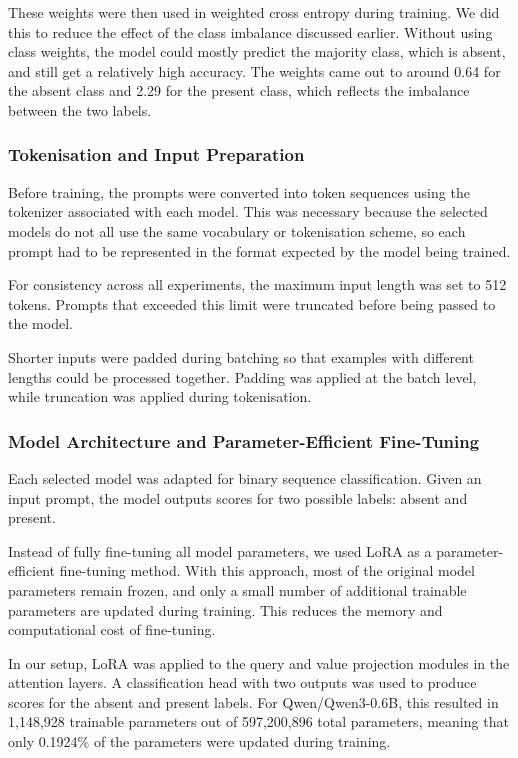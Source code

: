 These weights were then used in weighted cross entropy during training. We did this to reduce the effect of the class imbalance discussed earlier. Without using class weights, the model could mostly predict the majority class, which is absent, and still get a relatively high accuracy. The weights came out to around 0.64 for the absent class and 2.29 for the present class, which reflects the imbalance between the two labels.

\subsubsection{Tokenisation and Input Preparation}

Before training, the prompts were converted into token sequences using the tokenizer associated with each model. This was necessary because the selected models do not all use the same vocabulary or tokenisation scheme, so each prompt had to be represented in the format expected by the model being trained.

For consistency across all experiments, the maximum input length was set to 512 tokens. Prompts that exceeded this limit were truncated before being passed to the model.

Shorter inputs were padded during batching so that examples with different lengths could be processed together. Padding was applied at the batch level, while truncation was applied during tokenisation.

\subsubsection{Model Architecture and Parameter-Efficient Fine-Tuning}

Each selected model was adapted for binary sequence classification. Given an input prompt, the model outputs scores for two possible labels: absent and present.

Instead of fully fine-tuning all model parameters, we used LoRA as a parameter-efficient fine-tuning method. With this approach, most of the original model parameters remain frozen, and only a small number of additional trainable parameters are updated during training. This reduces the memory and computational cost of fine-tuning.

In our setup, LoRA was applied to the query and value projection modules in the attention layers. A classification head with two outputs was used to produce scores for the absent and present labels. For Qwen/Qwen3-0.6B, this resulted in 1,148,928 trainable parameters out of 597,200,896 total parameters, meaning that only 0.1924\% of the parameters were updated during training.

